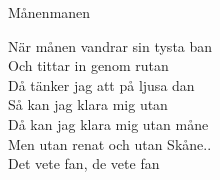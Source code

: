 \begin{song}{Månen}{manen}
\begin{vers}
När månen vandrar sin tysta ban\\
Och tittar in genom rutan\\
Då tänker jag att på ljusa dan\\
Så kan jag klara mig utan\\
Då kan jag klara mig utan måne\\
Men utan renat och utan Skåne..\\
Det vete fan, de vete fan\\
\end{vers}
\end{song}
